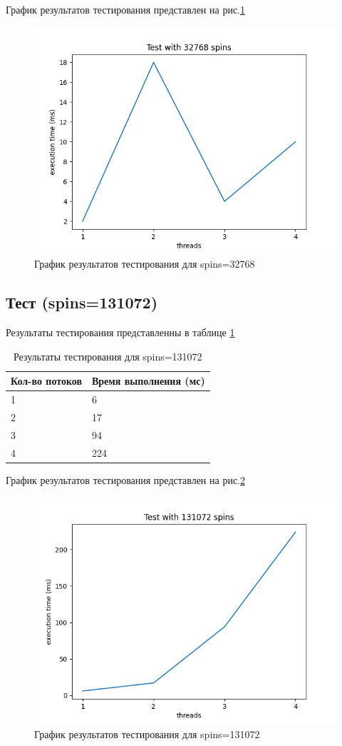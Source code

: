 График результатов тестирования представлен на рис.\ref{fig:plot32768}

\begin{figure}[H]
    \centering
    \includegraphics[width=0.7\linewidth]{photo/plot32768}
    \caption{График результатов тестирования для spins=32768}
    \label{fig:plot32768}
\end{figure}

\subsection*{Тест (spins=131072)}

Результаты тестирования представленны в таблице \ref{tab:results131072}


\begin{table}[H]
    \centering
    \begin{tabular}{|l|l|}
        \hline
        Кол-во потоков & Время выполнения (мс) \\
        \hline
        1 & 6 \\
        \hline
        2 & 17 \\
        \hline
        3 & 94 \\
        \hline
        4 & 224 \\
        \hline
    \end{tabular}
    \caption{Результаты тестирования для spins=131072}
    \label{tab:results131072}
\end{table}
        

График результатов тестирования представлен на рис.\ref{fig:plot131072}

\begin{figure}[H]
    \centering
    \includegraphics[width=0.7\linewidth]{photo/plot131072}
    \caption{График результатов тестирования для spins=131072}
    \label{fig:plot131072}
\end{figure}

